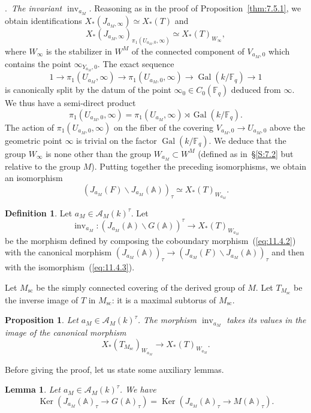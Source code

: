 \documentclass[12pt,a4paper,oneside,english,leqno]{smfart}
\makeatletter
\numberwithin{equation}{subsection}
\newcounter{theo}
\numberwithin{theo}{subsection}
\newenvironment{paragr}[1][]{\medskip\refstepcounter{subsection}%
  \par\noindent\hspace*{\parindent}\thesubsection.\ \emph{#1}%
  \@ifundefined{@empty}{}{}\ignorespaces}{\medskip}
\theoremstyle{plain}
\newtheorem{lemma}[theo]{Lemma}
\newtheorem{proposition}[theo]{Proposition}
\theoremstyle{definition}
\newtheorem{definition}[theo]{Definition}
\theoremstyle{remark}
\DeclareMathOperator{\scnx}{sc}
\DeclareMathOperator{\Gal}{Gal}
\DeclareMathOperator{\inv}{inv}
\DeclareMathOperator{\Ker}{Ker}
\newcommand{\AAA}{\mathbb{A}}
\newcommand{\Fq}{\mathbb{F}_q}
\newcommand{\Ac}{\mathcal{A}}
\newcommand{\back}{\backslash}
\makeatother
\begin{document}
\begin{paragr}[The invariant $\inv_{a_M}$.]
Reasoning as in the proof of Proposition~\ref{thm:7.5.1}, we obtain identifications $X_*(J_{a_M,\infty})\simeq X_*(T)$ and
$$
X_*(J_{a_M,\infty})_{\pi_1(U_{a_M,0},\infty)}\simeq X_*(T)_{W_\infty},
$$
where $W_\infty$ is the stabilizer in $W^M$ of the connected component of $V_{a_M,0}$ which contains the point $\infty_{Y_{a_M},0}$. The exact sequence
$$
1\longrightarrow\pi_1(U_{a_M},\infty)\longrightarrow\pi_1(U_{a_M,0},\infty) \longrightarrow\Gal(k/\Fq)\longrightarrow 1
$$
is canonically split by the datum of the point $\infty_0\in C_0(\Fq)$ deduced from $\infty$. We thus have a semi-direct product
$$
\pi_1(U_{a_M,0},\infty)=\pi_1(U_{a_M},\infty)\rtimes\Gal(k/\Fq).
$$
The action of $\pi_1(U_{a_M,0},\infty)$ on the fiber of the covering $V_{a_M,0}\to U_{a_M,0}$ above the geometric point $\infty$ is trivial on the factor $\Gal(k/\Fq)$. We deduce that the group $W_\infty$ is none other than the group $W_{a_M}\subset W^M$ (defined as in~\S\ref{S:7.2} but relative to the group $M$). Putting together the preceding isomorphisms, we obtain an isomorphism
\begin{equation}\label{eq:11.4.3}
(J_{a_M}(F)\back J_{a_M}(\AAA))_\tau\simeq X_*(T)_{W_{a_M}}.
\end{equation}

\begin{definition}\label{thm:11.4.1}
Let $a_M\in\Ac_M(k)^\tau$. Let
$$
\inv_{a_M}:(J_{a_M}(\AAA)\back G(\AAA))^\tau\to X_*(T)_{W_{a_M}}
$$
be the morphism defined by composing the coboundary morphism~(\ref{eq:11.4.2}) with the canonical morphism $(J_{a_M}(\AAA))_\tau\to(J_{a_M}(F)\back J_{a_M}(\AAA))_\tau$ and then with the isomorphism~(\ref{eq:11.4.3}).
\end{definition}

Let $M_{\scnx}$ be the simply connected covering of the derived group of $M$. Let $T_{M_{\scnx}}$ be the inverse image of $T$ in $M_{\scnx}$: it is a maximal subtorus of $M_{\scnx}$.

\begin{proposition}\label{thm:11.4.2}
Let $a_M\in\Ac_M(k)^\tau$. The morphism $\inv_{a_M}$ takes its values in the image of the canonical morphism
$$
X_*(T_{M_{\scnx}})_{W_{a_M}}\to X_*(T)_{W_{a_M}}.
$$
\end{proposition}

Before giving the proof, let us state some auxiliary lemmas.

\begin{lemma}\label{thm:11.4.3}
Let $a_M\in\Ac_M(k)^\tau$. We have
\begin{equation}\label{eq:11.4.4}
\Ker(J_{a_M}(\AAA)_\tau\to G(\AAA)_\tau)=\Ker(J_{a_M}(\AAA)_\tau\to M(\AAA)_\tau).
\end{equation}
\end{lemma}


\end{paragr}
\end{document}
